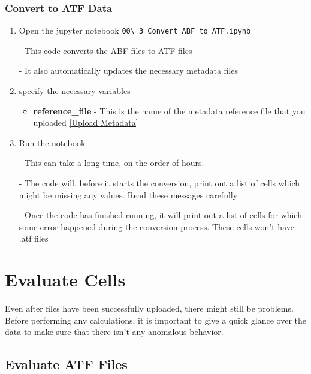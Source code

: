 \documentclass{article}
\begin{document}
\subsubsection{Convert to ATF Data} \label{Convert to ATF}

\begin{enumerate}
    \item Open the jupyter notebook \verb|00\_3 Convert ABF to ATF.ipynb|
    
    - This code converts the ABF files to ATF files
    
    - It also automatically updates the necessary metadata files
    
    \item specify the necessary variables
    
    \begin{itemize}
        \item \textbf{reference\_file} - This is the name of the metadata reference file that you uploaded \ref{Upload Metadata}
    \end{itemize}
    
    \item Run the notebook
    
    - This can take a long time, on the order of hours.
    
    - The code will, before it starts the conversion, print out a list of cells which might be missing any values. Read these messages carefully
    
    - Once the code has finished running, it will print out a list of cells for which some error happened during the conversion process. These cells won't have .atf files
\end{enumerate}

\section{Evaluate Cells}

Even after files have been successfully uploaded, there might still be problems. Before performing any calculations, it is important to give a quick glance over the data to make sure that there isn't any anomalous behavior.

\subsection{Evaluate ATF Files}
\end{document}
